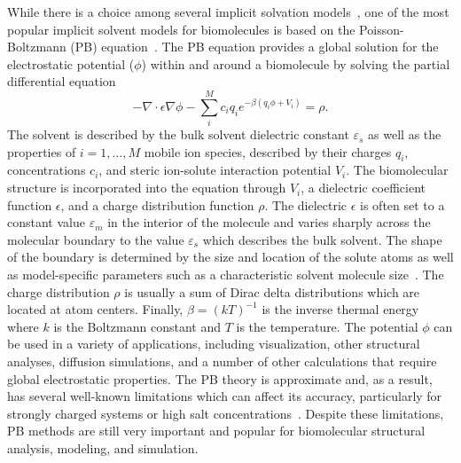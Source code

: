 \documentclass[12pt,titlepage]{article}
\begin{document}
While there is a choice among several implicit solvation models~\cite{Davis1990, Perutz1978, Ren2012, Sharp1990, Roux1999, Warshel2006}, one of the most popular implicit solvent models for biomolecules is based on the Poisson-Boltzmann (PB) equation~\cite{Fixman1979, Grochowski2008, Lamm2003}.
The PB equation provides a global solution for the electrostatic potential ($\phi$) within and around a biomolecule by solving the partial differential equation
\begin{equation}
	-\nabla \cdot \epsilon \nabla \phi - \sum_i^M c_i q_i e^{-\beta \left(q_i \phi + V_i \right)} = \rho.
	\label{eqn:pbe}
\end{equation}
The solvent is described by the bulk solvent dielectric constant $\varepsilon_s$ as well as the properties of $i=1,\ldots,M$ mobile ion species, described by their charges $q_i$, concentrations $c_i$, and steric ion-solute interaction potential $V_i$.
The biomolecular structure is incorporated into the equation through $V_i$, a dielectric coefficient function $\epsilon$, and a charge distribution function $\rho$.
The dielectric $\epsilon$ is often set to a constant value $\varepsilon_m$ in the interior of the molecule and varies sharply across the molecular boundary to the value $\varepsilon_s$ which describes the bulk solvent.
The shape of the boundary is determined by the size and location of the solute atoms as well as model-specific parameters such as a characteristic solvent molecule size~\cite{Lee1971}.
The charge distribution $\rho$ is usually a sum of Dirac delta distributions which are located at atom centers.
Finally, $\beta = \left( kT \right)^{-1}$ is the inverse thermal energy where $k$ is the Boltzmann constant and $T$ is the temperature.
The potential $\phi$ can be used in a variety of applications, including visualization, other structural analyses, diffusion simulations, and a number of other calculations that require global electrostatic properties.
The PB theory is approximate and, as a result, has several well-known limitations which can affect its accuracy, particularly for strongly charged systems or high salt concentrations~\cite{Fixman1979, Netz2000}.
Despite these limitations, PB methods are still very important and popular for biomolecular structural analysis, modeling, and simulation. 
\end{document}
